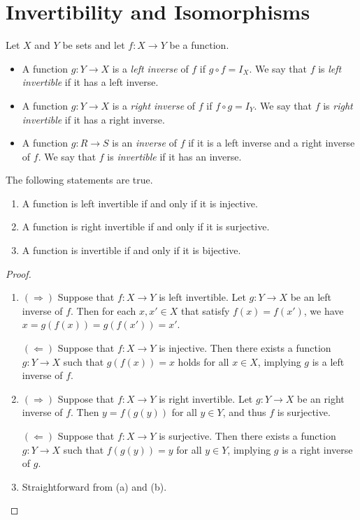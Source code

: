 \section{Invertibility and Isomorphisms}
\begin{definition}
  Let $X$ and $Y$ be sets and let $f: X \to Y$ be a function.
  \begin{itemize}
    \item A function $g: Y \to X$ is a \emph{left inverse} of $f$ if
      $g \circ f = I_X$.
      We say that $f$ is \emph{left invertible} if it has a left inverse.
    \item A function $g: Y \to X$ is a \emph{right inverse} of $f$ if
      $f \circ g = I_Y$.
      We say that $f$ is \emph{right invertible} if it has a right inverse.
    \item A function $g: R \to S$ is an \emph{inverse} of $f$ if it is a left
      inverse and a right inverse of $f$.
      We say that $f$ is \emph{invertible} if it has an inverse.
  \end{itemize}
\end{definition}

\begin{proposition}\label{prop:invertible}
  The following statements are true.
  \begin{enumerate}
    \item A function is left invertible if and only if it is injective.
    \item A function is right invertible if and only if it is surjective.
    \item A function is invertible if and only if it is bijective.
  \end{enumerate}
\end{proposition}
\begin{proof} \leavevmode
  \begin{enumerate}
    \item $(\Rightarrow)$
      Suppose that $f: X \to Y$ is left invertible.
      Let $g: Y \to X$ be an left inverse of $f$.
      Then for each $x, x' \in X$ that satisfy $f(x) = f(x')$, we have
      $x = g(f(x)) = g(f(x')) = x'$.

      $(\Leftarrow)$
      Suppose that $f: X \to Y$ is injective.
      Then there exists a function $g: Y \to X$ such that $g(f(x)) = x$ holds
      for all $x \in X$, implying $g$ is a left inverse of $f$.
    \item $(\Rightarrow)$
      Suppose that $f: X \to Y$ is right invertible.
      Let $g: Y \to X$ be an right inverse of $f$.
      Then $y = f(g(y))$ for all $y \in Y$, and thus $f$ is surjective.

      $(\Leftarrow)$
      Suppose that $f: X \to Y$ is surjective.
      Then there exists a function $g: Y \to X$ such that $f(g(y)) = y$ for
      all $y \in Y$, implying $g$ is a right inverse of $g$.
    \item Straightforward from (a) and (b). \qedhere
  \end{enumerate}
\end{proof}

